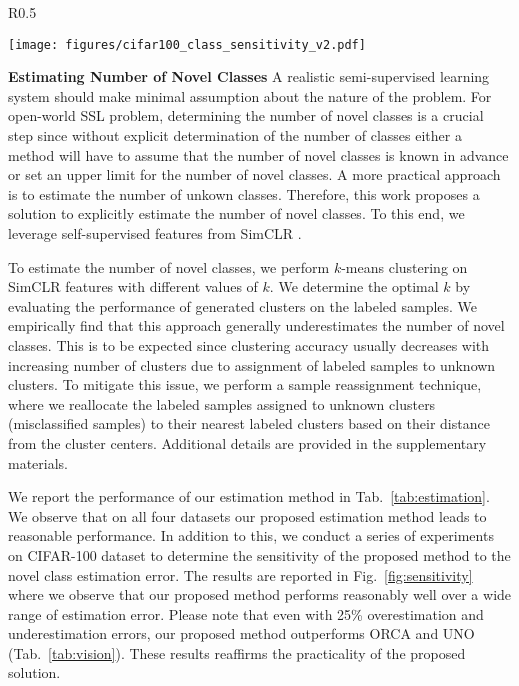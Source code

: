 \documentclass[runningheads]{eccv2022submission}
\begin{document}
\begin{wrapfigure}{R}{0.5\textwidth}
\vspace{-10mm}
\begin{center}
  \texttt{[image: figures/cifar100\_class\_sensitivity\_v2.pdf]}
\end{center}
\vspace{-6mm}
\caption{Accuracy as a function of class estimation error on \textbf{CIFAR-100} dataset.}
\vspace{-4mm}
\label{fig:sensitivity}
\end{wrapfigure}

\vspace{1mm}
\label{par:novel_estimation}
\noindent \textbf{Estimating Number of Novel Classes} A realistic semi-supervised learning system should make minimal assumption about the nature of the problem. For open-world SSL problem, determining the number of novel classes is a crucial step since without explicit determination of the number of classes either a method will have to assume that the number of novel classes is known in advance or set an upper limit for the number of novel classes. A more practical approach is to estimate the number of unkown classes. Therefore, this work proposes a solution to explicitly estimate the number of novel classes. To this end, we leverage self-supervised features from SimCLR \cite{chen2020simple}. 

To estimate the number of novel classes, we perform $k$-means clustering on SimCLR features with different values of $k$. We determine the optimal $k$ by evaluating the performance of generated clusters on the labeled samples. We empirically find that this approach generally underestimates the number of novel classes. This is to be expected since clustering accuracy usually decreases with increasing number of clusters due to assignment of labeled samples to unknown clusters. To mitigate this issue, we perform a sample reassignment technique, where we reallocate the labeled samples assigned to unknown clusters (misclassified samples) to their nearest labeled clusters based on their distance from the cluster centers. Additional details are provided in the supplementary materials.

We report the performance of our estimation method in Tab.~\ref{tab:estimation}. We observe that on all four datasets our proposed estimation method leads to reasonable performance. In addition to this, we conduct a series of experiments on CIFAR-100 dataset to determine the sensitivity of the proposed method to the novel class estimation error. The results are reported in Fig.~\ref{fig:sensitivity} where we observe that our proposed method performs reasonably well over a wide range of estimation error. Please note that even with 25\% overestimation and underestimation errors, our proposed method outperforms ORCA and UNO (Tab.~\ref{tab:vision}). These results reaffirms the practicality of the proposed solution.     
\end{document}

